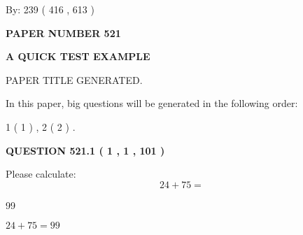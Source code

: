 \documentclass[12pt]{article}
\begin{document}
   
\hspace{1.0in} By: 
 239 ( 416 ,  613 )
   
   
   
   
\newpage 
\setcounter{page}{ 
   521001 } 
   
   
   
   
 {\textbf{ \Large{ PAPER NUMBER  521  }}}
   
   
\vspace{0.2in}
   
   
   
   
   
   
   
   
 \vspace{0.2in}
{\LARGE {\textbf{ A QUICK TEST EXAMPLE}}}
   
   
 PAPER TITLE GENERATED.
   
   
   
\vspace{0.2in}
   
In this paper, big questions will be generated in the following order: 
   
   
   1 ( 1 )
 ,
   2 ( 2 )
 .
  
\vspace{0.2in}
  
{\textbf{\Large{QUESTION
521.1 
 ( 1 , 1 , 101 )
}}}
  
  
 
Please calculate:
\begin{equation}
24 +  %
75 = \nonumber
\end{equation}
 
 
 
\noindent{}
 
 

99
 
 
\noindent{}
 
 

 
 
 
\noindent{}
 
 

$ %
24 +  %
75=   %
99$
 
 
\noindent{}
 
\end{document}
